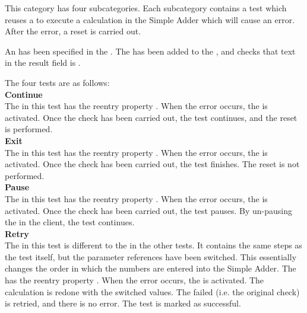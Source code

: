 

This category has four subcategories. Each subcategory contains a test which reuses a \gdcase{} to execute a calculation in the Simple Adder which will cause an error. After the error, a reset is carried out. 

An \gdehandler{} has been specified in the  \gdproject{}. The \gdehandler{} has been added to the \gdcase{}, and checks that text in the result field is . 

The four tests are as follows:\\

\textbf{Continue}\\
The \gdehandler{} in this test has the reentry property . When the error occurs, the \gdehandler{} is activated. Once the check has been carried out, the test continues, and the reset is performed. \\
\textbf{Exit}\\
The \gdehandler{} in this test has the reentry property . When the error occurs, the \gdehandler{} is activated. Once the check has been carried out, the test finishes. The reset is not performed.  \\
\textbf{Pause}\\
The \gdehandler{} in this test has the reentry property . When the error occurs, the \gdehandler{} is activated. Once the check has been carried out, the test pauses. By un-pausing the \gdsuite{} in the client, the test continues.   \\
\textbf{Retry}\\
The \gdehandler{} in this test is different to the \gdehandler{} in the other tests. It contains the same steps as the test itself, but the parameter references have been switched. This essentially changes the order in which the numbers are entered into the Simple Adder. The \gdehandler{} has the reentry property . When the error occurs, the \gdehandler{} is activated. The calculation is redone with the switched values. The failed \gdstep{} (i.e. the original check) is retried, and there is no error. The test is marked as successful.  \\


